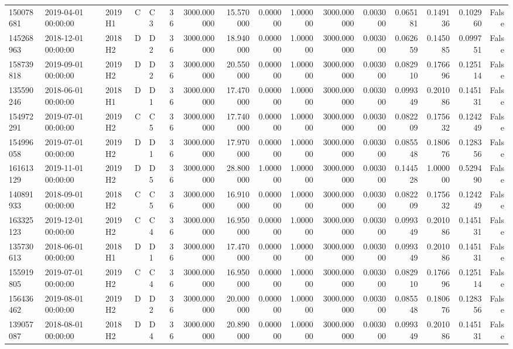 \begin{tabular}{lllllrrrrrrrrrrr}
150078681 & 2019-04-01 00:00:00 & 2019H1 & C & C3 & 36 & 3000.000000 & 15.570000 & 0.000000 & 1.000000 & 3000.000000 & 0.003000 & 0.065181 & 0.149136 & 0.102960 & False \\
145268963 & 2018-12-01 00:00:00 & 2018H2 & D & D2 & 36 & 3000.000000 & 18.940000 & 0.000000 & 1.000000 & 3000.000000 & 0.003000 & 0.062659 & 0.145085 & 0.099751 & False \\
158739818 & 2019-09-01 00:00:00 & 2019H2 & D & D2 & 36 & 3000.000000 & 20.550000 & 0.000000 & 1.000000 & 3000.000000 & 0.003000 & 0.082910 & 0.176696 & 0.125114 & False \\
135590246 & 2018-06-01 00:00:00 & 2018H1 & D & D1 & 36 & 3000.000000 & 17.470000 & 0.000000 & 1.000000 & 3000.000000 & 0.003000 & 0.099349 & 0.201086 & 0.145131 & False \\
154972291 & 2019-07-01 00:00:00 & 2019H2 & C & C5 & 36 & 3000.000000 & 17.740000 & 0.000000 & 1.000000 & 3000.000000 & 0.003000 & 0.082209 & 0.175632 & 0.124249 & False \\
154996058 & 2019-07-01 00:00:00 & 2019H2 & D & D1 & 36 & 3000.000000 & 17.970000 & 0.000000 & 1.000000 & 3000.000000 & 0.003000 & 0.085548 & 0.180676 & 0.128356 & False \\
161613129 & 2019-11-01 00:00:00 & 2019H2 & D & D5 & 36 & 3000.000000 & 28.800000 & 1.000000 & 1.000000 & 3000.000000 & 0.003000 & 0.144528 & 1.000000 & 0.529490 & False \\
140891933 & 2018-09-01 00:00:00 & 2018H2 & C & C5 & 36 & 3000.000000 & 16.910000 & 0.000000 & 1.000000 & 3000.000000 & 0.003000 & 0.082209 & 0.175632 & 0.124249 & False \\
163325123 & 2019-12-01 00:00:00 & 2019H2 & C & C4 & 36 & 3000.000000 & 16.950000 & 0.000000 & 1.000000 & 3000.000000 & 0.003000 & 0.099349 & 0.201086 & 0.145131 & False \\
135730613 & 2018-06-01 00:00:00 & 2018H1 & D & D1 & 36 & 3000.000000 & 17.470000 & 0.000000 & 1.000000 & 3000.000000 & 0.003000 & 0.099349 & 0.201086 & 0.145131 & False \\
155919805 & 2019-07-01 00:00:00 & 2019H2 & C & C4 & 36 & 3000.000000 & 16.950000 & 0.000000 & 1.000000 & 3000.000000 & 0.003000 & 0.082910 & 0.176696 & 0.125114 & False \\
156436462 & 2019-08-01 00:00:00 & 2019H2 & D & D2 & 36 & 3000.000000 & 20.000000 & 0.000000 & 1.000000 & 3000.000000 & 0.003000 & 0.085548 & 0.180676 & 0.128356 & False \\
139057087 & 2018-08-01 00:00:00 & 2018H2 & D & D4 & 36 & 3000.000000 & 20.890000 & 0.000000 & 1.000000 & 3000.000000 & 0.003000 & 0.099349 & 0.201086 & 0.145131 & False \\

\end{tabular}
